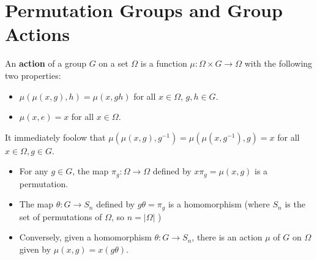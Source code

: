 \documentclass{memoir}
\begin{document}
\section{Permutation Groups and Group Actions}	

\begin{defn}[Action]
	An \textbf{action} of a group \(G\) on a set \(\Omega\) is a function \(\mu:\Omega \times G \to \Omega\) with the following two properties:
	\begin{itemize}
		\item \(\mu(\mu(x,g),h) = \mu(x,gh)\) for all \(x \in \Omega\), \(g,h \in G\).
		\item \(\mu(x,e) = x\) for all \(x \in \Omega\).
	\end{itemize}
\end{defn}
It immediately foolow that \(\mu(\mu(x,g),g^{-1}) = \mu(\mu(x,g^{-1}),g) = x\) for all \(x \in \Omega, g \in G\).

\begin{prop}
	\begin{itemize}
		\item For any \(g \in G\), the map \(\pi_g:\Omega\to \Omega\) defined by \(x\pi_g = \mu(x,g)\) is a permutation.
		\item The map \(\theta:G\to S_n\) defined by \(g\theta = \pi_g\) is a homomorphism (where \(S_n\) is the set of permutations of \(\Omega\), so \(n = \left| \Omega \right| \) )
		\item Conversely, given a homomorphism \(\theta:G\to S_n\), there is an action \(\mu\) of \(G\) on \(\Omega\) given by \(\mu(x,g) = x(g\theta)\).
	\end{itemize}
\end{prop}
\end{document}

